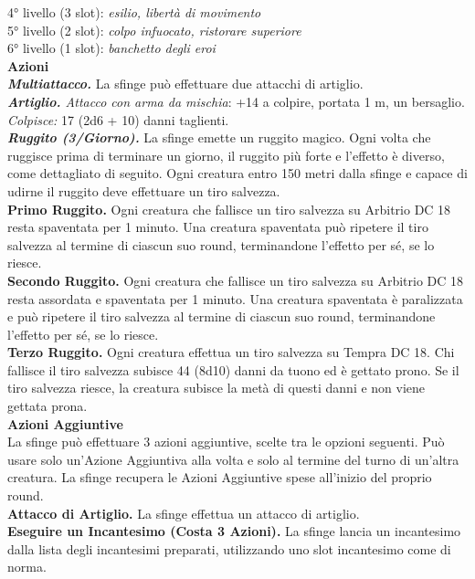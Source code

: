 \begin{multicols}{2}
4° livello (3 slot): \emph{esilio, libertà di movimento}\\
5° livello (2 slot): \emph{colpo infuocato, ristorare superiore}\\
6° livello (1 slot): \emph{banchetto degli eroi}\\
\smallskip\textbf{Azioni}\\
\emph{\textbf{Multiattacco.}} La sfinge può effettuare due attacchi di artiglio.\\
\emph{\textbf{Artiglio.} Attacco con arma da mischia}: +14 a colpire, portata 1 m, un bersaglio.\\
\emph{Colpisce:} 17 (2d6 + 10) danni taglienti.\\
\emph{\textbf{Ruggito (3/Giorno).}} La sfinge emette un ruggito magico. Ogni volta che ruggisce prima di terminare un giorno, il ruggito più forte e l'effetto è diverso, come dettagliato di seguito. Ogni creatura entro 150 metri dalla sfinge e capace di udirne il ruggito deve effettuare un tiro salvezza.\\
\textbf{Primo Ruggito.} Ogni creatura che fallisce un tiro salvezza su Arbitrio DC 18 resta spaventata per 1 minuto. Una creatura spaventata può ripetere il tiro salvezza al termine di ciascun suo round, terminandone l'effetto per sé, se lo riesce.\\
\textbf{Secondo Ruggito.} Ogni creatura che fallisce un tiro salvezza su Arbitrio DC 18 resta assordata e spaventata per 1 minuto. Una creatura spaventata è paralizzata e può ripetere il tiro salvezza al termine di ciascun suo round, terminandone l'effetto per sé, se lo riesce.\\
\textbf{Terzo Ruggito.} Ogni creatura effettua un tiro salvezza su Tempra DC 18. Chi fallisce il tiro salvezza subisce 44 (8d10) danni da tuono ed è gettato prono. Se il tiro salvezza riesce, la
creatura subisce la metà di questi danni e non viene gettata prona.\\
\textbf{Azioni Aggiuntive}\\
La sfinge può effettuare 3 azioni aggiuntive, scelte tra le opzioni seguenti. Può usare solo un'Azione Aggiuntiva alla volta e solo al termine del turno di un'altra creatura. La sfinge recupera le Azioni Aggiuntive spese all'inizio del proprio round.\\
\textbf{Attacco di Artiglio.} La sfinge effettua un attacco di artiglio. \\
\textbf{Eseguire un Incantesimo (Costa 3 Azioni).} La sfinge lancia un incantesimo dalla lista degli incantesimi preparati, utilizzando uno slot incantesimo come di norma.\\

\end{multicols}
